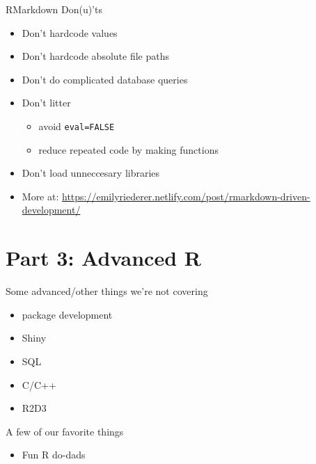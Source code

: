 \documentclass[
  ignorenonframetext,
]{beamer}
\providecommand{\tightlist}{%
  \setlength{\itemsep}{0pt}\setlength{\parskip}{0pt}}
\begin{document}
\begin{frame}[fragile]{RMarkdown Don(u)'ts}
\protect\hypertarget{rmarkdown-donuts}{}

\begin{itemize}
\tightlist
\item
  Don't hardcode values
\item
  Don't hardcode absolute file paths
\item
  Don't do complicated database queries
\item
  Don't litter

  \begin{itemize}
  \tightlist
  \item
    avoid \texttt{eval=FALSE}
  \item
    reduce repeated code by making functions
  \end{itemize}
\item
  Don't load unneccesary libraries
\item
  More at:
  \url{https://emilyriederer.netlify.com/post/rmarkdown-driven-development/}
\end{itemize}

\end{frame}

\hypertarget{part-3-advanced-r}{%
\section{Part 3: Advanced R}\label{part-3-advanced-r}}

\begin{frame}{Some advanced/other things we're not covering}
\protect\hypertarget{some-advancedother-things-were-not-covering}{}

\begin{itemize}
\tightlist
\item
  package development
\item
  Shiny
\item
  SQL
\item
  C/C++
\item
  R2D3
\end{itemize}

\end{frame}

\begin{frame}{A few of our favorite things}
\protect\hypertarget{a-few-of-our-favorite-things}{}

\begin{itemize}
\tightlist
\item
  Fun R do-dads
\end{itemize}

\end{frame}
\end{document}
